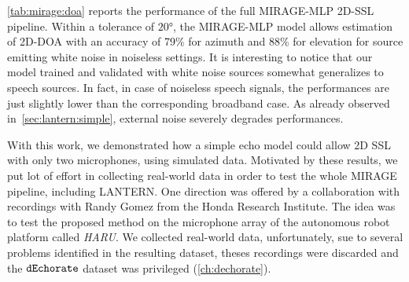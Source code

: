 \cref{tab:mirage:doa} reports the performance of the full MIRAGE-MLP 2D-SSL pipeline.
Within a tolerance of $\ang{20}$, the MIRAGE-MLP model allows estimation of 2D-\ac{DOA} with an accuracy of 79\% for azimuth and 88\% for elevation for source emitting white noise in noiseless settings.
It is interesting to notice that our model trained and validated with white noise sources somewhat generalizes to speech sources.
In fact, in case of noiseless speech signals, the performances are just slightly lower than the corresponding broadband case.
As already observed in~\cref{sec:lantern:simple}, external noise severely degrades performances.

\mynewline
With this work, we demonstrated how a simple echo model could allow 2D SSL with only two microphones, using simulated data.
Motivated by these results, we put lot of effort in collecting real-world data in order to test the whole \ac{MIRAGE} pipeline, including \ac{LANTERN}.
One direction was offered by a collaboration with recordings with Randy Gomez from the Honda Research Institute.
The idea was to test the proposed method on the microphone array of the autonomous robot platform called \textit{HARU}.
We collected real-world data, unfortunately, sue to several problems identified in the resulting dataset, theses recordings were discarded and the $\texttt{dEchorate}$ dataset was privileged (\cref{ch:dechorate}).




